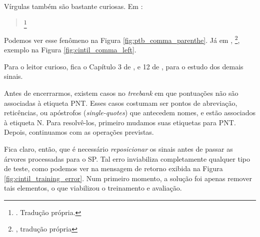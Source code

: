 Vírgulas também são bastante curiosas. Em \cite[p~52]{bracketing_ptb}: 
\begin{quote}
    \footnote{. Tradução própria.}
\end{quote}

Podemos ver esse fenômeno na Figura \ref{fig:ptb_comma_parenthe}. Já em \cite[p~30]{cintil_handbook}, 
\footnote{, tradução própria}, exemplo na Figura \ref{fig:cintil_comma_left}.

\begin{center}
    
\end{center}

Para o leitor curioso, fica o Capítulo 3 de \cite{bracketing_ptb}, e 12 de \cite{cintil_handbook}, para o estudo dos demais sinais.

Antes de encerrarmos, existem casos no \textit{treebank} em que pontuações não são associadas à etiqueta PNT. Esses casos costumam ser pontos de abreviação, reticências, ou apóstrofos (\textit{single-quotes}) que antecedem nomes, e estão associados à etiqueta N. Para resolvê-los, primeiro mudamos suas etiquetas para PNT. Depois, continuamos com as operações previstas.

Fica claro, então, que é necessário \textit{reposicionar} os sinais antes de passar as árvores processadas para o SP. 
Tal erro inviabiliza completamente qualquer tipo de teste, como podemos ver na mensagem de retorno exibida na Figura \ref{fig:cintil_training_error}. Num primeiro momento, a solução foi apenas remover tais elementos, o que viabilizou o treinamento e avaliação.

